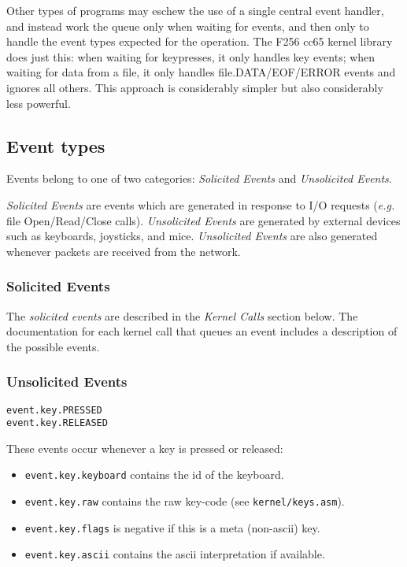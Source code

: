 Other types of programs may eschew the use of a single central event handler, and instead work the queue only when waiting for events, and then only to handle the event types expected for the operation.  The F256 cc65 kernel library does just this: when waiting for keypresses, it only handles key events; when waiting for data from a file, it only handles file.DATA/EOF/ERROR events and ignores all others.  This approach is considerably simpler but also considerably less powerful.

\subsection*{Event types}
Events belong to one of two categories: {\em Solicited Events} and {\em Unsolicited Events}.

{\em Solicited Events} are events which are generated in response to I/O requests ({\it e.g.} file Open/Read/Close calls).  {\em Unsolicited Events} are generated by external devices such as keyboards, joysticks, and mice.  {\em Unsolicited Events} are also generated whenever packets are received from the network.

\subsubsection*{Solicited Events}
The {\em solicited events} are described in the {\em Kernel Calls} section below.  The documentation for each kernel call that queues an event includes a description of the possible events.

\subsubsection*{Unsolicited Events}
\begin{verbatim}
event.key.PRESSED
event.key.RELEASED
\end{verbatim}

These events occur whenever a key is pressed or released:

\begin{itemize}
    \item \verb+event.key.keyboard+ contains the id of the keyboard.
    \item \verb+event.key.raw+ contains the raw key-code (see \verb+kernel/keys.asm+).
    \item \verb+event.key.flags+ is negative if this is a meta (non-ascii) key.
    \item \verb+event.key.ascii+ contains the ascii interpretation if available.
\end{itemize}

